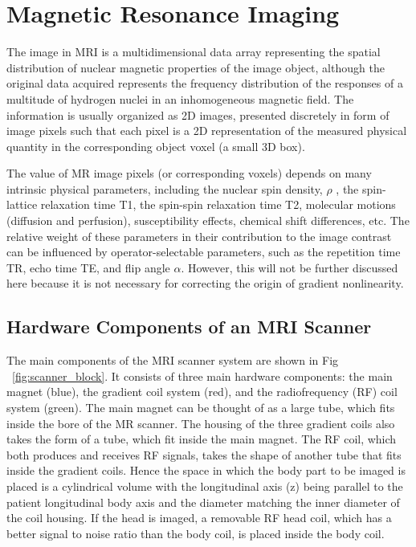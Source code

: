 \section{Magnetic Resonance Imaging}
The image in MRI is a multidimensional data array representing the spatial distribution of nuclear 
magnetic properties of the image object, although the original data acquired represents the frequency 
distribution of the responses of a multitude of hydrogen nuclei in an inhomogeneous magnetic field. The 
information is usually organized as 2D images, presented discretely in form of image pixels such that 
each pixel is a 2D representation of the measured physical quantity in the corresponding object voxel 
(a small 3D box).

The value of MR image pixels (or corresponding voxels) depends on many intrinsic physical parameters, 
including the nuclear spin density, $\rho$ , the spin-lattice relaxation time T1, the spin-spin 
relaxation time T2, molecular motions (diffusion and perfusion), susceptibility effects, chemical shift 
differences, etc. The relative weight of these parameters in their contribution to the image contrast 
can be influenced by operator-selectable parameters, such as the repetition time TR, echo time TE, and 
flip angle $\alpha$. However, this will not be further discussed here because it is not necessary for 
correcting the origin of gradient nonlinearity.

\subsection{Hardware Components of an MRI Scanner}

The main components of the MRI scanner system are shown in Fig ~\ref{fig:scanner_block}. 
It consists of three main hardware 
components: the main magnet (blue), the gradient coil system (red), and the radiofrequency (RF) coil 
system (green). The main magnet can be thought of as a large tube, which fits inside the bore of the MR 
scanner. The housing of the three gradient coils also takes the form of a tube, which fit inside the 
main magnet. The RF coil, which both produces and receives RF signals, takes the shape of another 
tube that fits inside the gradient coils. Hence the space in which the body part to be imaged is placed 
is a cylindrical volume with the longitudinal axis (z) being parallel to the patient longitudinal body 
axis and the diameter matching the inner diameter of the coil housing. If the head is imaged, a 
removable RF head coil, which has a better signal to noise ratio than the body coil, is placed inside 
the body coil.

